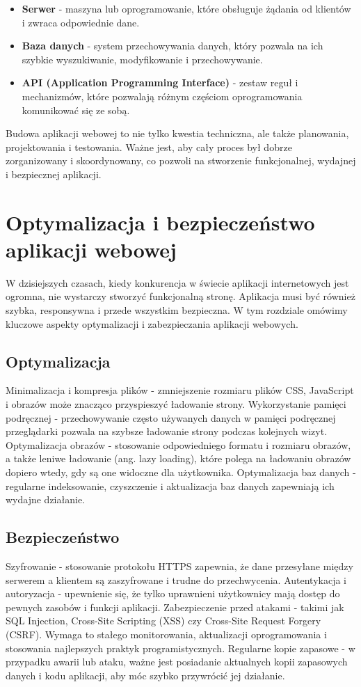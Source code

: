 \begin{itemize}
\item \textbf{Serwer} - maszyna lub oprogramowanie, które obsługuje żądania od klientów i zwraca odpowiednie dane.
\item \textbf{Baza danych} - system przechowywania danych, który pozwala na ich szybkie wyszukiwanie, modyfikowanie i przechowywanie.
\item \textbf{API (Application Programming Interface)} - zestaw reguł i mechanizmów, które pozwalają różnym częściom oprogramowania komunikować się ze sobą.
\end{itemize}


Budowa aplikacji webowej to nie tylko kwestia techniczna, ale także planowania, projektowania i testowania. Ważne jest, aby cały proces był dobrze zorganizowany i skoordynowany, co pozwoli na stworzenie funkcjonalnej, wydajnej i bezpiecznej aplikacji.

\section{Optymalizacja i bezpieczeństwo aplikacji webowej}

W dzisiejszych czasach, kiedy konkurencja w świecie aplikacji internetowych jest ogromna, nie wystarczy stworzyć funkcjonalną stronę. Aplikacja musi być również szybka, responsywna i przede wszystkim bezpieczna. W tym rozdziale omówimy kluczowe aspekty optymalizacji i zabezpieczania aplikacji webowych.

\subsection{Optymalizacja}
\cite{optymalizacja}
Minimalizacja i kompresja plików - zmniejszenie rozmiaru plików CSS, JavaScript i obrazów może znacząco przyspieszyć ładowanie strony.
Wykorzystanie pamięci podręcznej - przechowywanie często używanych danych w pamięci podręcznej przeglądarki pozwala na szybsze ładowanie strony podczas kolejnych wizyt.
Optymalizacja obrazów - stosowanie odpowiedniego formatu i rozmiaru obrazów, a także leniwe ładowanie (ang. lazy loading), które polega na ładowaniu obrazów dopiero wtedy, gdy są one widoczne dla użytkownika.
Optymalizacja baz danych - regularne indeksowanie, czyszczenie i aktualizacja baz danych zapewniają ich wydajne działanie.

\subsection{Bezpieczeństwo}
\cite{sekurakBezpieczenstwo}
Szyfrowanie - stosowanie protokołu HTTPS zapewnia, że dane przesyłane między serwerem a klientem są zaszyfrowane i trudne do przechwycenia.
Autentykacja i autoryzacja - upewnienie się, że tylko uprawnieni użytkownicy mają dostęp do pewnych zasobów i funkcji aplikacji.
Zabezpieczenie przed atakami - takimi jak SQL Injection, Cross-Site Scripting (XSS) czy Cross-Site Request Forgery (CSRF). Wymaga to stałego monitorowania, aktualizacji oprogramowania i stosowania najlepszych praktyk programistycznych.
Regularne kopie zapasowe - w przypadku awarii lub ataku, ważne jest posiadanie aktualnych kopii zapasowych danych i kodu aplikacji, aby móc szybko przywrócić jej działanie.

